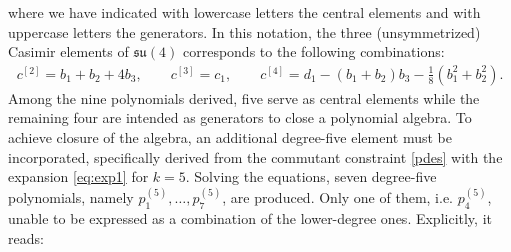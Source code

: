 \documentclass[10pt]{amsart}
\theoremstyle{definition}
\theoremstyle{corollary}
\theoremstyle{remark}
\theoremstyle{conclusion}
\begin{document}
\noindent where we have indicated with lowercase letters the central elements and with uppercase letters the generators. In this notation, the three (unsymmetrized) Casimir elements of $\mathfrak{su}(4)$ corresponds to the following combinations:
\begin{align}
c^{[2]}=b_1+b_2+4 b_3 , \qquad c^{[3]}=c_1 , \qquad c^{[4]}=d_1-(b_1 +b_2) b_3-\frac{1}{8}(b_1^2+b_2^2).
\end{align}
Among the nine polynomials derived, five serve as central elements while the remaining four are intended as generators to close a polynomial algebra. To achieve closure of the algebra, an additional degree-five element must be incorporated, specifically derived from the commutant constraint \eqref{pdes} with the expansion \eqref{eq:exp1} for $k=5$. Solving the equations, seven degree-five polynomials, namely $p_1^{(5)}, \dots, p_7^{(5)}$, are produced. Only one of them, i.e. $p_4^{(5)}$, unable to be expressed as a combination of the lower-degree ones. Explicitly, it reads:
\end{document}
